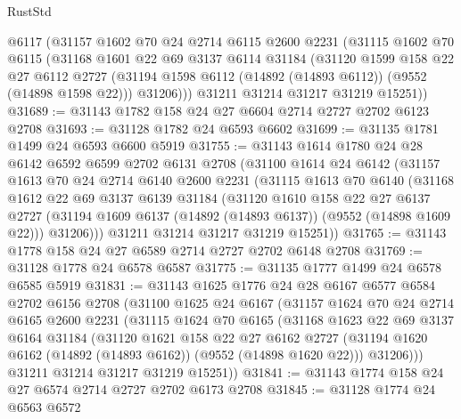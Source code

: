 \begin{lexlean}{RustStd}
\begin{coremodule}
      @6117
      (@31157
        @1602
        @70
        @24
        @2714
        @6115
        @2600
        @2231
        (@31115
          @1602
          @70
          @6115
          (@31168
            @1601
            @22
            @69
            @3137
            @6114
            @31184
            (@31120
              @1599
              @158
              @22
              @27
              @6112
              @2727
              (@31194 @1598 @6112 (@14892 (@14893 @6112)) (@9552 (@14898 @1598 @22)))
              @31206)))
        @31211
        @31214
        @31217
        @31219
        @15251))
@31689 := @31143 @1782 @158 @24 @27 @6604 @2714 @2727 @2702 @6123 @2708
@31693 := @31128 @1782 @24 @6593 @6602
@31699 := @31135 @1781 @1499 @24 @6593 @6600 @5919
@31755 := @31143
    @1614
    @1780
    @24
    @28
    @6142
    @6592
    @6599
    @2702
    @6131
    @2708
    (@31100
      @1614
      @24
      @6142
      (@31157
        @1613
        @70
        @24
        @2714
        @6140
        @2600
        @2231
        (@31115
          @1613
          @70
          @6140
          (@31168
            @1612
            @22
            @69
            @3137
            @6139
            @31184
            (@31120
              @1610
              @158
              @22
              @27
              @6137
              @2727
              (@31194 @1609 @6137 (@14892 (@14893 @6137)) (@9552 (@14898 @1609 @22)))
              @31206)))
        @31211
        @31214
        @31217
        @31219
        @15251))
@31765 := @31143 @1778 @158 @24 @27 @6589 @2714 @2727 @2702 @6148 @2708
@31769 := @31128 @1778 @24 @6578 @6587
@31775 := @31135 @1777 @1499 @24 @6578 @6585 @5919
@31831 := @31143
    @1625
    @1776
    @24
    @28
    @6167
    @6577
    @6584
    @2702
    @6156
    @2708
    (@31100
      @1625
      @24
      @6167
      (@31157
        @1624
        @70
        @24
        @2714
        @6165
        @2600
        @2231
        (@31115
          @1624
          @70
          @6165
          (@31168
            @1623
            @22
            @69
            @3137
            @6164
            @31184
            (@31120
              @1621
              @158
              @22
              @27
              @6162
              @2727
              (@31194 @1620 @6162 (@14892 (@14893 @6162)) (@9552 (@14898 @1620 @22)))
              @31206)))
        @31211
        @31214
        @31217
        @31219
        @15251))
@31841 := @31143 @1774 @158 @24 @27 @6574 @2714 @2727 @2702 @6173 @2708
@31845 := @31128 @1774 @24 @6563 @6572

\end{coremodule}
\end{lexlean}
